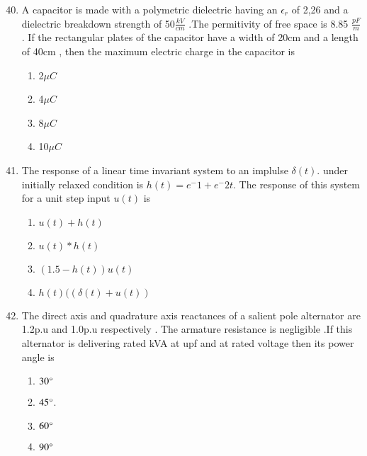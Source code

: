 \documentclass[journal]{IEEEtran}
\begin{document}
\begin{enumerate}
    \setcounter{enumi}{39}
 

    \item A capacitor is made with a polymetric dielectric having an $\epsilon_r$ of 2,26 and a dielectric breakdown strength of 50$\frac{kV}{cm}$ .The permitivity of free space is 8.85 $\frac{pF}{m}$ . If the rectangular plates of the capacitor have a width of 20cm and a length of 40cm , then the maximum electric charge in the capacitor is
    \begin{multicols}{4}
			\begin{enumerate}
\item 2$\mu C$
\item 4$\mu C$
\item 8$\mu C$
\item 10$\mu C$
        \end{enumerate}
		\end{multicols}


    \item The response of a linear time invariant system to an implulse $\delta (t)$. under initially relaxed condition is $h(t)=e^-1 +e^-2t$. The response of this system for a unit step input $u(t)$ is


		\begin{multicols}{4}
			\begin{enumerate}
	\item  $u(t) +h(t)$
\item $u(t)*h(t)$
\item$(1.5-h(t))u(t)$
\item $h(t)((\delta  (t) + u(t))$
			\end{enumerate}
		\end{multicols}


    \item The direct axis and quadrature axis reactances of a salient pole alternator are 1.2p.u and 1.0p.u respectively . The armature resistance is negligible .If this alternator is delivering rated kVA at upf and at rated voltage then its power angle is 
        
            \begin{enumerate}
             \item $30\degree$
\item $45\degree$.
\item  $60\degree$
\item $90\degree$            \end{enumerate}




\end{enumerate}
\end{document}
